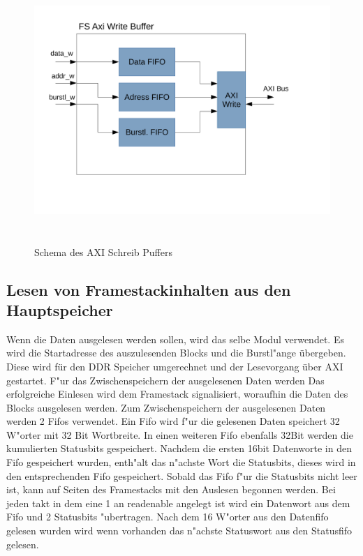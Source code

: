 \begin{figure}
	\centering
	\includegraphics[height = 10cm]{PS_RS_graphics/AxiWriteBuffer.pdf}
	\caption{Schema des AXI Schreib Puffers}
\end{figure}

\subsection{Lesen von Framestackinhalten aus den Hauptspeicher}
Wenn die Daten ausgelesen werden sollen, wird das selbe Modul verwendet. Es wird die Startadresse des auszulesenden Blocks und die Burstl"ange \"ubergeben. Diese wird f\"ur den DDR Speicher umgerechnet und der Lesevorgang \"uber AXI gestartet. F"ur das Zwischenspeichern der ausgelesenen Daten werden  Das erfolgreiche Einlesen wird dem Framestack signalisiert, woraufhin die Daten des Blocks ausgelesen werden. Zum Zwischenspeichern der ausgelesenen Daten werden 2 Fifos verwendet. Ein Fifo wird f"ur die gelesenen Daten speichert 32 W"orter mit 32 Bit Wortbreite. In einen weiteren Fifo ebenfalls 32Bit werden die kumulierten Statusbits gespeichert. Nachdem die ersten 16bit Datenworte in den Fifo gespeichert wurden, enth"alt das n"achste Wort die Statusbits, dieses wird in den entsprechenden Fifo gespeichert. Sobald das Fifo f"ur die Statusbits nicht leer ist, kann auf Seiten des Framestacks mit den Auslesen begonnen werden. Bei jeden takt in dem eine 1 an readenable angelegt ist wird ein Datenwort aus dem Fifo und 2 Statusbits "ubertragen. Nach dem 16 W"orter aus den Datenfifo gelesen wurden wird wenn vorhanden das n"achste Statuswort aus den Statusfifo gelesen. 

